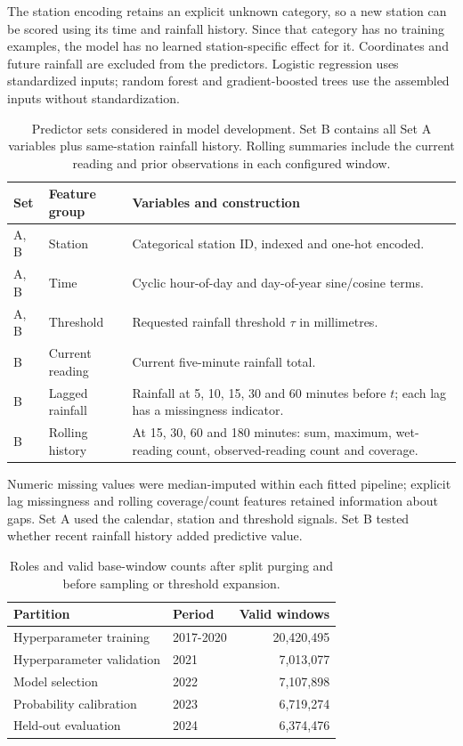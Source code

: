 \documentclass[11pt,a4paper]{article}
\begin{document}
The station encoding retains an explicit unknown category, so a new station
can be scored using its time and rainfall history. Since that category has no
training examples, the model has no learned station-specific effect for it.
Coordinates and future rainfall are excluded from the predictors. Logistic
regression uses standardized inputs; random forest and gradient-boosted trees
use the assembled inputs without standardization.

\begin{table}[htbp]
\centering\small
\caption{Predictor sets considered in model development. Set B contains all
Set A variables plus same-station rainfall history. Rolling summaries include
the current reading and prior observations in each configured window.}
\label{tab:features}
\begin{tabularx}{\linewidth}{l l X}
\toprule
Set & Feature group & Variables and construction \\
\midrule
A, B & Station & Categorical station ID, indexed and one-hot encoded. \\
A, B & Time & Cyclic hour-of-day and day-of-year sine/cosine terms. \\
A, B & Threshold & Requested rainfall threshold $\tau$ in millimetres. \\
B & Current reading & Current five-minute rainfall total. \\
B & Lagged rainfall & Rainfall at 5, 10, 15, 30 and 60 minutes before $t$;
each lag has a missingness indicator. \\
B & Rolling history & At 15, 30, 60 and 180 minutes: sum, maximum, wet-reading
count, observed-reading count and coverage. \\
\bottomrule
\end{tabularx}
\end{table}

Numeric missing values were median-imputed within each fitted pipeline;
explicit lag missingness and rolling coverage/count features retained
information about gaps. Set A used the calendar, station and threshold
signals. Set B tested whether recent rainfall history added predictive value.

\begin{table}[htbp]
\centering\small
\caption{Roles and valid base-window counts after split purging and before
sampling or threshold expansion.}
\label{tab:splits}
\begin{tabular}{l l r}
\toprule
Partition & Period & Valid windows \\
\midrule
Hyperparameter training & 2017-2020 & 20,420,495 \\
Hyperparameter validation & 2021 & 7,013,077 \\
Model selection & 2022 & 7,107,898 \\
Probability calibration & 2023 & 6,719,274 \\
Held-out evaluation & 2024 & 6,374,476 \\
\bottomrule
\end{tabular}
\end{table}
\end{document}
